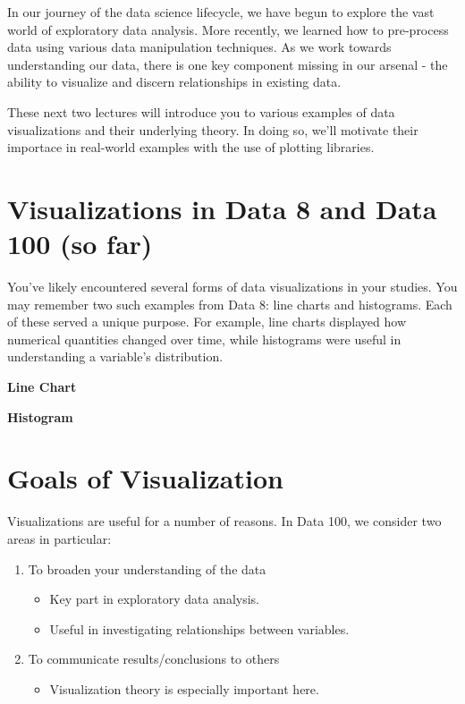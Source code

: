 \documentclass[
  letterpaper,
  DIV=11,
  numbers=noendperiod]{scrreprt}
\providecommand{\tightlist}{%
  \setlength{\itemsep}{0pt}\setlength{\parskip}{0pt}}\usepackage{longtable,booktabs,array}
\begin{document}
In our journey of the data science lifecycle, we have begun to explore
the vast world of exploratory data analysis. More recently, we learned
how to pre-process data using various data manipulation techniques. As
we work towards understanding our data, there is one key component
missing in our arsenal - the ability to visualize and discern
relationships in existing data.

These next two lectures will introduce you to various examples of data
visualizations and their underlying theory. In doing so, we'll motivate
their importace in real-world examples with the use of plotting
libraries.

\hypertarget{visualizations-in-data-8-and-data-100-so-far}{%
\section{Visualizations in Data 8 and Data 100 (so
far)}\label{visualizations-in-data-8-and-data-100-so-far}}

You've likely encountered several forms of data visualizations in your
studies. You may remember two such examples from Data 8: line charts and
histograms. Each of these served a unique purpose. For example, line
charts displayed how numerical quantities changed over time, while
histograms were useful in understanding a variable's distribution.

\textbf{Line Chart}

\textbf{Histogram}

\hypertarget{goals-of-visualization}{%
\section{Goals of Visualization}\label{goals-of-visualization}}

Visualizations are useful for a number of reasons. In Data 100, we
consider two areas in particular:

\begin{enumerate}
\def\labelenumi{\arabic{enumi}.}
\tightlist
\item
  To broaden your understanding of the data

  \begin{itemize}
  \tightlist
  \item
    Key part in exploratory data analysis.
  \item
    Useful in investigating relationships between variables.
  \end{itemize}
\item
  To communicate results/conclusions to others

  \begin{itemize}
  \tightlist
  \item
    Visualization theory is especially important here.
  \end{itemize}
\end{enumerate}
\end{document}
